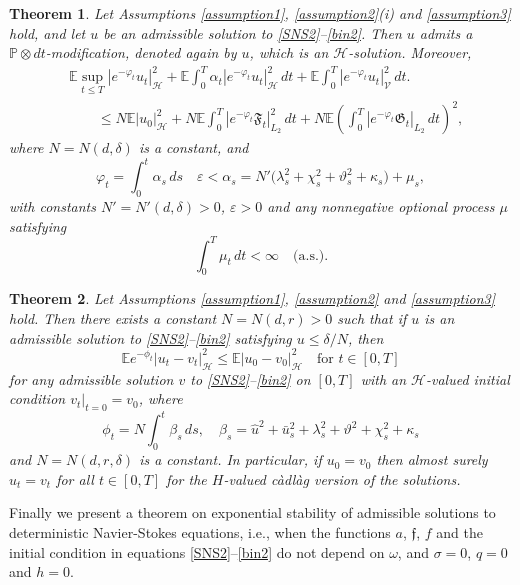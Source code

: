\documentclass[11pt,reqno]{amsart}
\newtheorem{theorem}{Theorem}[section]
\theoremstyle{definition}
\theoremstyle{remark}
\newcommand\bP{\mathbb{P}}
\newcommand\frf{\mathfrak{f}}
\newcommand\frF{\mathfrak{F}}
\newcommand\frG{\mathfrak{G}}
\newcommand\cH{\mathcal{H}}
\newcommand{\<}{\langle}
\renewcommand{\>}{\rangle}
\newcommand{\E}{\mathbb{E}}
\begin{document}
\begin{theorem}
                                 \label{theorem2}
Let Assumptions \ref{assumption1}, \ref{assumption2}(i) 
and \ref{assumption3} hold, and let $u$ be an admissible solution to
\eqref{SNS2}--\eqref{bin2}. Then $u$ admits a
$\bP\otimes dt$-modification, denoted again by $u$, 
which is an $\mathcal H$-solution. Moreover,                                        
\begin{align}
&\E\sup_{t\le T}|e^{-\varphi_t}u_t|_{\mathcal H}^2
+\E\int_0^T\alpha_t|e^{-\varphi_t}u_t|_{\mathcal H}^2\,dt
+\E\int_0^T|e^{-\varphi_t}u_t|_{\mathcal V}^2\,dt.  \nonumber\\
&\qquad\leq
N \E|u_0|_{\mathcal H}^2
+
N \E\int_0^T
|e^{-\varphi_t}\frF_t|_{ L_2}^2\,dt
+
N \E\left(\int_0^T|e^{-\varphi_t}\frG_t|_{L_2}\,dt\right)^2, \nonumber
\end{align}
where
$N=N(d,\delta)$ is a constant, 
and
$$
\varphi_t
=
\int_0^t \alpha_s\,ds 
\quad
\varepsilon <\alpha_s
=N'\big(\lambda_s^2+\chi_s^2+\vartheta_s^2+\kappa_s\big)
+\mu_s,
$$
with constants
$N'=N'(d,\delta)>0$,  $\varepsilon >0$
and any nonnegative optional process 
$\mu$ satisfying
$$
\int_0^T \mu_t\,dt<\infty
\quad\text{(a.s.).}
$$
\end{theorem}

\begin{theorem}
                                            \label{theorem3}
Let Assumptions \ref{assumption1}, 
\ref{assumption2} and \ref{assumption3} hold.  
Then there exists a constant 
$N=N(d,r)>0$
such that if $u$ is an admissible solution 
to \eqref{SNS2}--\eqref{bin2} satisfying 
$u\leq \delta/N$, then 
$$
\E e^{-\phi_{t}}|u_t-v_t|^2_{\cH}
\leq \E |u_0-v_0|_{\cH}^2\quad\text{for $t\in[0,T]$} 
$$
for any admissible solution $v$ to \eqref{SNS2}--\eqref{bin2} 
on $[0,T]$ with an $\cH$-valued initial condition 
$v_t|_{t=0}=v_0$, where 
$$
\phi_t=N\int_0^t\beta_s\,ds,
\quad 
\beta_s=\hat u^2+\bar u_s^2+\lambda^2_s+\vartheta^2+\chi^2_s+\kappa_s
$$
and $N=N(d,r,\delta)$ is a constant. In particular, if $u_0=v_0$ 
then almost surely $u_t=v_t$ for all $t\in[0,T]$ for the $H$-valued c\`adl\`ag  
version of the solutions. 
\end{theorem}

Finally we present a theorem on exponential stability of admissible 
solutions to deterministic Navier-Stokes equations, i.e., when the functions 
$a$, $\frf$, $f$ and the initial condition in equations \eqref{SNS2}--\eqref{bin2} 
do not depend on $\omega$, and 
$\sigma=0$, $q=0$ and $h=0$. 
\end{document}
